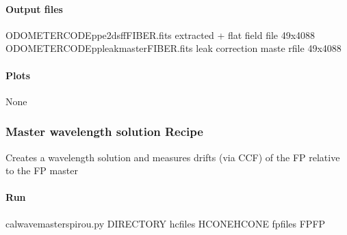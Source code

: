 \documentclass[a4paper,10pt,english]{report}
\begin{document}
\paragraph{Output files}
\label{\detokenize{user/spirou/recipes/leak_master:output-files}}
\begin{sphinxVerbatim}[commandchars=\\\{\}]
ODOMETER\PYGZus{}CODE\PYGZus{}pp\PYGZus{}e2dsff\PYGZus{}FIBER.fits             extracted + flat field file 49x4088
ODOMETER\PYGZus{}CODE\PYGZus{}pp\PYGZus{}leak\PYGZus{}master\PYGZus{}FIBER.fits         leak correction maste rfile 49x4088
\end{sphinxVerbatim}


\paragraph{Plots}
\label{\detokenize{user/spirou/recipes/leak_master:plots}}
\begin{sphinxVerbatim}[commandchars=\\\{\}]
None
\end{sphinxVerbatim}


\subsubsection{Master wavelength solution Recipe}
\label{\detokenize{user/spirou/recipes/wave_master:master-wavelength-solution-recipe}}\label{\detokenize{user/spirou/recipes/wave_master:recipes-spirou-wave-master}}\label{\detokenize{user/spirou/recipes/wave_master::doc}}
Creates a wavelength solution and measures drifts (via CCF) of the FP relative
to the FP master


\paragraph{Run}
\label{\detokenize{user/spirou/recipes/wave_master:run}}
\begin{sphinxVerbatim}[commandchars=\\\{\}]
cal\PYGZus{}wave\PYGZus{}master\PYGZus{}spirou.py \PYG{o}{[}DIRECTORY\PYG{o}{]} \PYGZhy{}hcfiles \PYG{o}{[}HCONE\PYGZus{}HCONE\PYG{o}{]} \PYGZhy{}fpfiles \PYG{o}{[}FP\PYGZus{}FP\PYG{o}{]}
\end{sphinxVerbatim}
\end{document}
